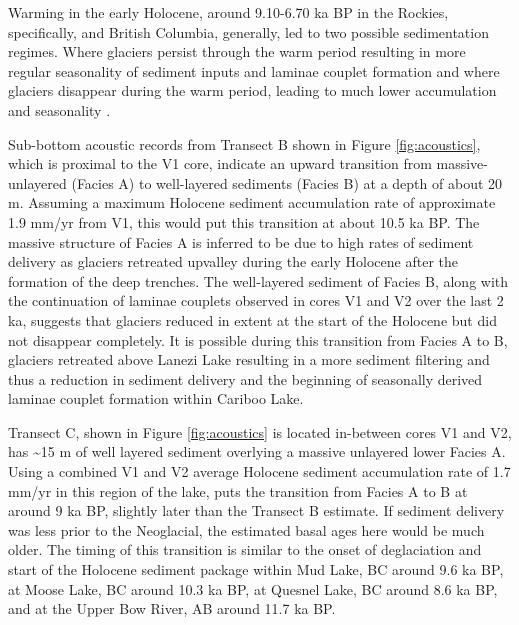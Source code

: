 \documentclass[Royal,times,doublespace,sageh]{sagej}
\begin{document}
Warming in the early Holocene, around 9.10-6.70 ka BP in the Rockies,
specifically, \citep{Luckman1986} and British Columbia, generally,
\citep{Clague1989} led to two possible sedimentation regimes. Where
glaciers persist through the warm period resulting in more regular
seasonality of sediment inputs and laminae couplet formation
\citep[e.g.~Mud Lake,][]{Hodder2006} and where glaciers disappear during
the warm period, leading to much lower accumulation and seasonality
\citep[e.g.~Moose Lake,][]{Desloges1999}.

Sub-bottom acoustic records from Transect B shown in Figure
\ref{fig:acoustics}, which is proximal to the V1 core, indicate an
upward transition from massive-unlayered (Facies A) to well-layered
sediments (Facies B) at a depth of about 20 m. Assuming a maximum
Holocene sediment accumulation rate of approximate 1.9 mm/yr from V1,
this would put this transition at about 10.5 ka BP. The massive
structure of Facies A is inferred to be due to high rates of sediment
delivery as glaciers retreated upvalley during the early Holocene after
the formation of the deep trenches. The well-layered sediment of Facies
B, along with the continuation of laminae couplets observed in cores V1
and V2 over the last 2 ka, suggests that glaciers reduced in extent at
the start of the Holocene but did not disappear completely. It is
possible during this transition from Facies A to B, glaciers retreated
above Lanezi Lake resulting in a more sediment filtering and thus a
reduction in sediment delivery and the beginning of seasonally derived
laminae couplet formation within Cariboo Lake.

Transect C, shown in Figure \ref{fig:acoustics} is located in-between
cores V1 and V2, has \textasciitilde15 m of well layered sediment
overlying a massive unlayered lower Facies A. Using a combined V1 and V2
average Holocene sediment accumulation rate of 1.7 mm/yr in this region
of the lake, puts the transition from Facies A to B at around 9 ka BP,
slightly later than the Transect B estimate. If sediment delivery was
less prior to the Neoglacial, the estimated basal ages here would be
much older. The timing of this transition is similar to the onset of
deglaciation and start of the Holocene sediment package within Mud Lake,
BC \citep{Hodder2006} around 9.6 ka BP, at Moose Lake, BC
\citep{Desloges1999} around 10.3 ka BP, at Quesnel Lake, BC
\citep{Gilbert2012} around 8.6 ka BP, and at the Upper Bow River, AB
\citep{Leonard1999} around 11.7 ka BP.
\end{document}
